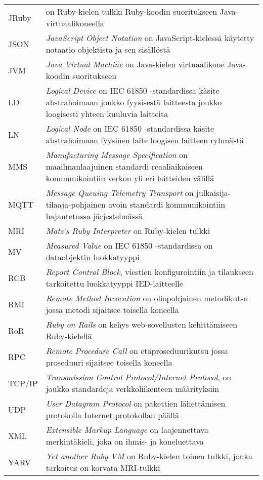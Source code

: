 \begin{tabularx}{\linewidth}[h]{@{} p{} p{} @{}}
	JRuby & on Ruby-kielen tulkki Ruby-koodin suoritukseen Java-virtuaalikoneella \\
	JSON & \emph{JavaScript Object Notation} on JavaScript-kielessä käytetty notaatio objektista ja sen sisällöstä \\
	JVM & \emph{Java Virtual Machine} on Java-kielen virtuaalikone Java-koodin suoritukseen \\
	LD & \emph{Logical Device} on IEC 61850 -standardissa käsite abstrahoimaan joukko fyysisestä laitteesta joukko loogisesti yhteen kuuluvia laitteita \\
	LN & \emph{Logical Node} on IEC 61850 -standardissa käsite abstrahoimaan fyysinen laite loogisen laitteen ryhmästä \\
	MMS & \emph{Manufacturing Message Specification} on maailmanlaajuinen standardi reaaliaikaiseen kommunikointiin verkon yli eri laitteiden välillä \\
	MQTT & \emph{Message Queuing Telemetry Transport} on julkaisija-tilaaja-pohjainen avoin standardi kommunikointiin hajautetussa järjestelmässä \\
	MRI & \emph{Matz’s Ruby Interpreter} on Ruby-kielen tulkki \\
	MV & \emph{Measured Value} on IEC 61850 -standardissa on dataobjektin luokkatyyppi \\
	RCB & \emph{Report Control Block}, viestien konfigurointiin ja tilaukseen tarkoitettu luokkatyyppi IED-laitteelle \\
	RMI & \emph{Remote Method Invocation} on oliopohjainen metodikutsu jossa metodi sijaitsee toisella koneella \\
	RoR & \emph{Ruby on Rails} on kehys web-sovellusten kehittämiseen Ruby-kielellä \\
	RPC & \emph{Remote Procedure Call} on etäproseduurikutsu jossa proseduuri sijaitsee toisella koneella \\
	TCP/IP & \emph{Transmission Control Protocol/Internet Protocol}, on joukko standardeja verkkoliikenteen määrityksiin \\
	UDP & \emph{User Datagram Protocol} on pakettien lähettämisen protokolla Internet protokollan päällä \\
	XML & \emph{Extensible Markup Language} on laajennettava merkintäkieli, joka on ihmis- ja koneluettava \\
	YARV & \emph{Yet another Ruby VM} on Ruby-kielen toinen tulkki, jonka tarkoitus on korvata MRI-tulkki \\
\end{tabularx}